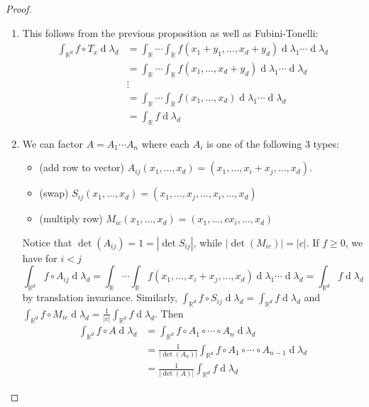 \documentclass[11pt, a4paper]{memoir}
\DeclareMathOperator{\R}{{\mathbb{R}}}
\theoremstyle{change}
\theoremstyle{plain}
\theoremstyle{nonumberplain}
\newtheorem{proof}{Proof}
\renewcommand{\d}[1]{\ensuremath{\operatorname{d}\!{#1}}}
\numberwithin{equation}{section}
\begin{document}
\begin{proof}
    \begin{enumerate}[label=(\roman*)]
        \item This follows from the previous proposition as well as Fubini-Tonelli:
            \begin{align*}
                \int_{\R^d}f\circ T_x\d{\lambda_d} &= \int_{\R}\cdots\int_{\R}f(x_1+y_1,\ldots,x_d+y_d)\d{\lambda_1}\cdots\d{\lambda_d}\\
                                                   &= \int_{\R}\cdots\int_{\R}f(x_1,\ldots,x_d+y_d)\d{\lambda_1}\cdots\d{\lambda_d}\\
                                                   &\vdots\\
                                                   &= \int_{\R}\cdots\int_{\R}f(x_1,\ldots,x_d)\d{\lambda_1}\cdots\d{\lambda_d}\\
                                                   &= \int_{\R}f\d{\lambda_d}
            \end{align*}
        \item We can factor $A=A_1\cdots A_n$ where each $A_i$ is one of the following 3 types:
            \begin{itemize}[nolistsep]
                \item (add row to vector) $A_{ij}(x_1,\ldots,x_d)=(x_1,\ldots,x_i+x_j,\ldots,x_d)$.
                \item (swap) $S_{ij}(x_1,\ldots,x_d)=(x_1,\ldots,x_j,\ldots,x_i,\ldots,x_d)$
                \item (multiply row) $M_{ic}(x_1,\ldots,x_d)=(x_1,\ldots,cx_i,\ldots,x_d)$
            \end{itemize}
            Notice that $\det(A_{ij})=1=|\det S_{ij}|$, while $|\det(M_{ic})|=|c|$.
            If $f\geq 0$, we have for $i<j$
            \begin{equation*}
                \int_{\R^d}f\circ A_{ij}\d{\lambda_d}=\int_{\R}\cdots\int_{\R} f(x_1,\ldots,x_i+x_j,\ldots,x_d)\d{\lambda_1}\cdots\d{\lambda_d}=\int_{\R^d}f\d{\lambda_d}
            \end{equation*}
            by translation invariance.
            Similarly, $\int_{\R^d}f\circ S_{ij}\d{\lambda_d}=\int_{\R^d}f\d{\lambda_d}$ and $\int_{\R^d}f\circ M_{ic}\d{\lambda_d}=\frac{1}{|c|}\int_{\R^d}f\d{\lambda_d}$.
            Then
            \begin{align*}
                \int_{\R^d}f\circ A\d{\lambda_d} &= \int_{\R^d}f\circ A_1\circ\cdots\circ A_n\d{\lambda_d}\\
                                                 &=\frac{1}{|\det(A_n)|}\int_{\R^d}f\circ A_1\circ\cdots\circ A_{n-1}\d{\lambda_d}\\
                                                 &= \frac{1}{|\det(A)|}\int_{\R^d}f\d{\lambda_d}
            \end{align*}
    \end{enumerate}
\end{proof}
\end{document}
